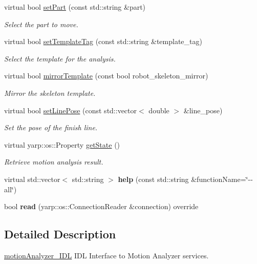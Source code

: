 \begin{DoxyCompactItemize}
virtual bool \hyperlink{classmotionAnalyzer__IDL_ae6a1abf3aac4582688320f30a75bf768}{set\+Part} (const std\+::string \&part)
\begin{DoxyCompactList}\small\item\em Select the part to move. \end{DoxyCompactList}\item 
virtual bool \hyperlink{classmotionAnalyzer__IDL_a60012ac489f03d4bd8fb272c557b0144}{set\+Template\+Tag} (const std\+::string \&template\+\_\+tag)
\begin{DoxyCompactList}\small\item\em Select the template for the analysis. \end{DoxyCompactList}\item 
virtual bool \hyperlink{classmotionAnalyzer__IDL_a7c16a7a17fa15d7bc8ef369f7de0c90f}{mirror\+Template} (const bool robot\+\_\+skeleton\+\_\+mirror)
\begin{DoxyCompactList}\small\item\em Mirror the skeleton template. \end{DoxyCompactList}\item 
virtual bool \hyperlink{classmotionAnalyzer__IDL_a9169bb6dd0ca068bd040bab9d93724ed}{set\+Line\+Pose} (const std\+::vector$<$ double $>$ \&line\+\_\+pose)
\begin{DoxyCompactList}\small\item\em Set the pose of the finish line. \end{DoxyCompactList}\item 
virtual yarp\+::os\+::\+Property \hyperlink{classmotionAnalyzer__IDL_ab7f4dca083dfc447fdefea7760b95c43}{get\+State} ()
\begin{DoxyCompactList}\small\item\em Retrieve motion analysis result. \end{DoxyCompactList}\item 
\mbox{\label{classmotionAnalyzer__IDL_a11954460905060e7f9d7ec2a287cee72}} 
virtual std\+::vector$<$ std\+::string $>$ {\bfseries help} (const std\+::string \&function\+Name=\char`\"{}-\/-\/all\char`\"{})
\item 
\mbox{\label{classmotionAnalyzer__IDL_a155c67538af54a6f3ec82381b921a159}} 
bool {\bfseries read} (yarp\+::os\+::\+Connection\+Reader \&connection) override
\end{DoxyCompactItemize}


\subsection{Detailed Description}
\hyperlink{classmotionAnalyzer__IDL}{motion\+Analyzer\+\_\+\+I\+DL} I\+DL Interface to Motion Analyzer services. 

